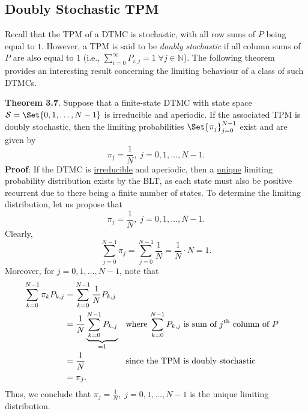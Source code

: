 \subsection*{Doubly Stochastic TPM}
Recall that the TPM of a DTMC is stochastic, with all row sums of $P$ being equal to $1$.
However, a TPM is said to be \emph{doubly stochastic} if all column sums of $P$ are also equal to $1$
(i.e., $ \sum_{i=0}^{\infty} P_{i,j}=1\;\forall j\in\mathbb{N} $). The following theorem provides an interesting result concerning
the limiting behaviour of a class of such DTMCs.
\begin{Result}
    \textbf{Theorem 3.7}. Suppose that a finite-state DTMC with state space $ \mathcal{S}=\Set{0,1,\ldots,N-1} $ is
    irreducible and aperiodic. If the associated TPM is doubly stochastic, then the limiting
    probabilities $ \Set{\pi_j}_{j=0}^{N-1} $ exist and are given by
    \[ \pi_j=\frac{1}{N} ,\; j=0,1,\ldots,N-1. \]
    \tcblower{}
    \textbf{Proof}: If the DTMC is \underline{irreducible} and aperiodic,
    then a \underline{unique} limiting probability distribution exists by the BLT,
    as each state must also be positive recurrent due to there being a finite
    number of states. To determine the limiting distribution, let us propose that
    \[ \pi_j=\frac{1}{N} ,\; j=0,1,\ldots,N-1. \]
    Clearly,
    \[ \sum_{j=0}^{N-1} \pi_j=\sum_{j=0}^{N-1} \frac{1}{N}=\frac{1}{N}\cdot N=1.  \]
    Moreover, for $ j=0,1,\ldots,N-1 $, note that
    \begin{align*}
        \sum_{k=0}^{N-1} \pi_k P_{k,j}
         & =\sum_{k=0}^{N-1} \frac{1}{N} P_{k,j}                                                                                                                \\
         & =\frac{1}{N} \underbrace{\sum_{k=0}^{N-1} P_{k,j}}_{=1} &  & \text{where $\sum_{k=0}^{N-1} P_{k,j}$ is sum of $j\textsuperscript{th}$ column of $P$} \\
         & =\frac{1}{N}                                            &  & \text{since the TPM is doubly stochastic}                                               \\
         & =\pi_j.
    \end{align*}
    Thus, we conclude that $ \pi_j=\frac{1}{N} ,\; j=0,1,\ldots,N-1 $
    is the unique limiting distribution.
\end{Result}

